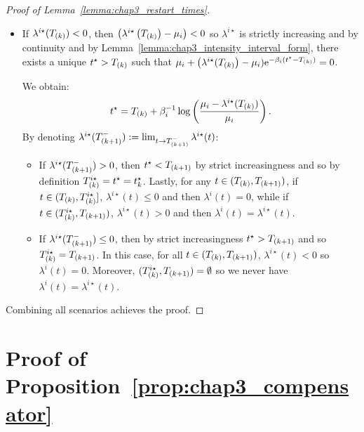 \begin{subappendices}
\begin{proof}[Proof of Lemma~\ref{lemma:chap3_restart_times}]
\begin{itemize}
            \item If $\lambda^{i\star}(T\park) < 0$, then $\left(\lambda^{i\star}\left(T\park\right) - \mu_i\right) < 0$ so $\lambda^{i\star}$ is strictly increasing and by continuity and by Lemma~\ref{lemma:chap3_intensity_interval_form}, there exists a unique $t^\star > T\park$ such that $\mu_i + \left(\lambda^{i\star}(T\park\right) - \mu_i)\mathrm{e}^{-\beta_i(t^\star-T\park)} = 0$.
  
                We obtain:
                \[t^\star = T\park + \beta_i^{-1}\log{\adaptedpar{\frac{\mu_i - \lambda^{i\star}(T\park)}{\mu_i}}}\,.\] By denoting $\lambda^{i\star}(T\park[k+1]^-) := \lim_{t\to T\park[k+1]^-}{\lambda^{i\star}(t)}$:
  
            \begin{itemize}
                \item If $\lambda^{i\star}(T\park[k+1]^-) > 0$, then $t^\star < T\park[k+1]$ by strict increasingness and so by definition $T^{i\star}\park = t^\star = t^\star_k$.
                Lastly, for any $t\in(T\park, T\park[k+1])$,
                if $t\in(T\park, T^{i\star}\park]$, $\lambda^{i\star}(t) \leq 0$ and then $\lambda^i(t) = 0$,
                while if $t\in(T^{i\star}\park, T\park[k+1])$, $\lambda^{i\star}(t) > 0$ and then $\lambda^i(t) = \lambda^{i\star}(t)$.
                
                \item If $\lambda^{i\star}(T\park[k+1]^-) \leq 0$, then by strict increasingness $t^\star > T\park[k+1]$ and so $T\park^{i\star} = T\park[k+1]$.
                In this case, for all $t\in(T\park, T\park[k+1])$,
                $\lambda^{i\star}(t) < 0$ so $\lambda^i(t)=0$.
                Moreover, $(T^{i\star}\park, T\park[k+1]) = \emptyset$ so we never have $\lambda^i(t) = \lambda^{i\star}(t)$.
            \end{itemize}
  
  
        \end{itemize}
  
        Combining all scenarios achieves the proof.
      \end{proof}
      
  \section{Proof of Proposition~\ref{prop:chap3_compensator}} \label{app:chap3_proof_prop_compensator}
      

\end{subappendices}
